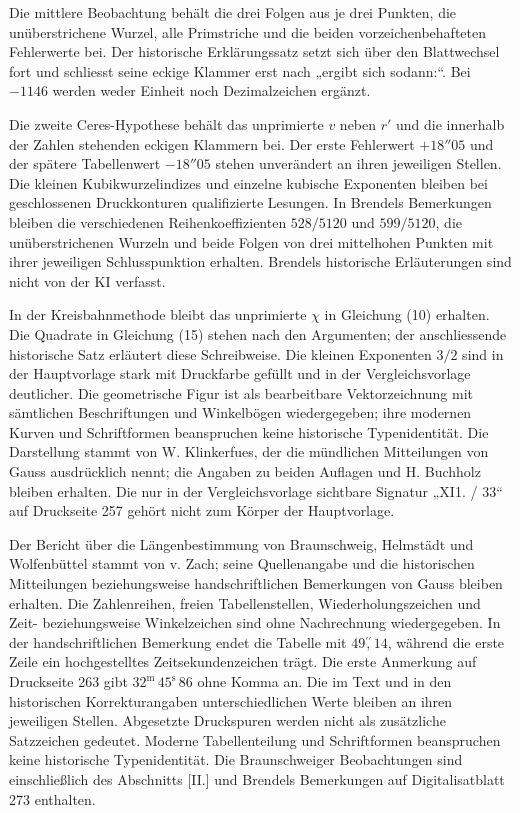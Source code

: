 Die mittlere Beobachtung behält die drei Folgen aus je drei Punkten, die unüberstrichene Wurzel, alle Primstriche und die beiden vorzeichenbehafteten Fehlerwerte bei. Der historische Erklärungssatz setzt sich über den Blattwechsel fort und schliesst seine eckige Klammer erst nach „ergibt sich sodann:“. Bei $-1146$ werden weder Einheit noch Dezimalzeichen ergänzt.

Die zweite Ceres-Hypothese behält das unprimierte $v$ neben $r'$ und die innerhalb der Zahlen stehenden eckigen Klammern bei. Der erste Fehlerwert $+18''05$ und der spätere Tabellenwert $-18''05$ stehen unverändert an ihren jeweiligen Stellen. Die kleinen Kubikwurzelindizes und einzelne kubische Exponenten bleiben bei geschlossenen Druckkonturen qualifizierte Lesungen. In Brendels Bemerkungen bleiben die verschiedenen Reihenkoeffizienten $528/5120$ und $599/5120$, die unüberstrichenen Wurzeln und beide Folgen von drei mittelhohen Punkten mit ihrer jeweiligen Schlusspunktion erhalten. Brendels historische Erläuterungen sind nicht von der KI verfasst.

In der Kreisbahnmethode bleibt das unprimierte $\chi$ in Gleichung (10) erhalten. Die Quadrate in Gleichung (15) stehen nach den Argumenten; der anschliessende historische Satz erläutert diese Schreibweise. Die kleinen Exponenten $3/2$ sind in der Hauptvorlage stark mit Druckfarbe gefüllt und in der Vergleichsvorlage deutlicher. Die geometrische Figur ist als bearbeitbare Vektorzeichnung mit sämtlichen Beschriftungen und Winkelbögen wiedergegeben; ihre modernen Kurven und Schriftformen beanspruchen keine historische Typenidentität. Die Darstellung stammt von W. Klinkerfues, der die mündlichen Mitteilungen von Gauss ausdrücklich nennt; die Angaben zu beiden Auflagen und H. Buchholz bleiben erhalten. Die nur in der Vergleichsvorlage sichtbare Signatur „XI1. / 33“ auf Druckseite 257 gehört nicht zum Körper der Hauptvorlage.

Der Bericht über die Längenbestimmung von Braunschweig, Helmstädt und Wolfenbüttel stammt von v. Zach; seine Quellenangabe und die historischen Mitteilungen beziehungsweise handschriftlichen Bemerkungen von Gauss bleiben erhalten. Die Zahlenreihen, freien Tabellenstellen, Wiederholungszeichen und Zeit- beziehungsweise Winkelzeichen sind ohne Nachrechnung wiedergegeben. In der handschriftlichen Bemerkung endet die Tabelle mit $49\mathord{\overset{\prime\prime}{,}}14$, während die erste Zeile ein hochgestelltes Zeitsekundenzeichen trägt. Die erste Anmerkung auf Druckseite 263 gibt $32^{\mathrm m}\,45^{\mathrm s}\,86$ ohne Komma an. Die im Text und in den historischen Korrekturangaben unterschiedlichen Werte bleiben an ihren jeweiligen Stellen. Abgesetzte Druckspuren werden nicht als zusätzliche Satzzeichen gedeutet. Moderne Tabellenteilung und Schriftformen beanspruchen keine historische Typenidentität. Die Braunschweiger Beobachtungen sind einschließlich des Abschnitts [II.] und Brendels Bemerkungen auf Digitalisatblatt 273 enthalten.

